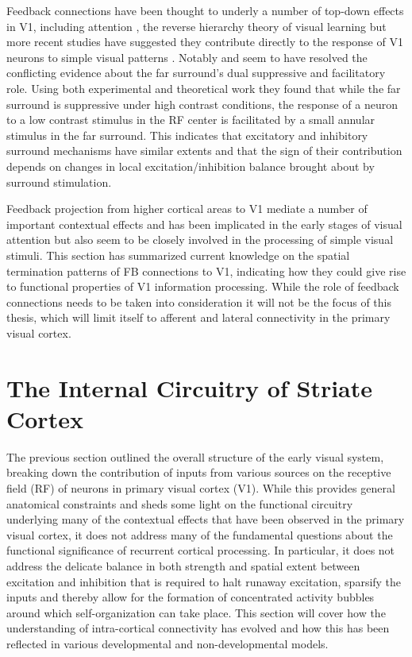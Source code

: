 Feedback connections have been thought to underly a number of top-down
effects in V1, including attention \citep{Treue2003}, the reverse
hierarchy theory of visual learning \citep{Ahissar2004} but more
recent studies have suggested they contribute directly to the response
of V1 neurons to simple visual patterns
\citep{Angelucci2002,Angelucci2003,Schwabe2006}. Notably
\cite{Schwabe2006} and \cite{Ichida2007} seem to have resolved the
conflicting evidence about the far surround's dual suppressive and
facilitatory role. Using both experimental and theoretical work they
found that while the far surround is suppressive under high contrast
conditions, the response of a neuron to a low contrast stimulus in the
RF center is facilitated by a small annular stimulus in the far
surround. This indicates that excitatory and inhibitory surround
mechanisms have similar extents and that the sign of their
contribution depends on changes in local excitation/inhibition balance
brought about by surround stimulation.

Feedback projection from higher cortical areas to V1 mediate a number
of important contextual effects and has been implicated in the early
stages of visual attention but also seem to be closely involved in the
processing of simple visual stimuli. This section has summarized
current knowledge on the spatial termination patterns of FB
connections to V1, indicating how they could give rise to functional
properties of V1 information processing. While the role of feedback
connections needs to be taken into consideration it will not be the
focus of this thesis, which will limit itself to afferent and lateral
connectivity in the primary visual cortex.

\section{The Internal Circuitry of Striate Cortex}

The previous section outlined the overall structure of the early visual
system, breaking down the contribution of inputs from various sources
on the receptive field (RF) of neurons in primary visual cortex
(V1). While this provides general anatomical constraints and sheds
some light on the functional circuitry underlying many of the
contextual effects that have been observed in the primary visual
cortex, it does not address many of the fundamental questions about
the functional significance of recurrent cortical processing. In
particular, it does not address the delicate balance in both strength
and spatial extent between excitation and inhibition that is required
to halt runaway excitation, sparsify the inputs and thereby allow for
the formation of concentrated activity bubbles around which
self-organization can take place. This section will cover how the
understanding of intra-cortical connectivity has evolved and how this
has been reflected in various developmental and non-developmental
models.

